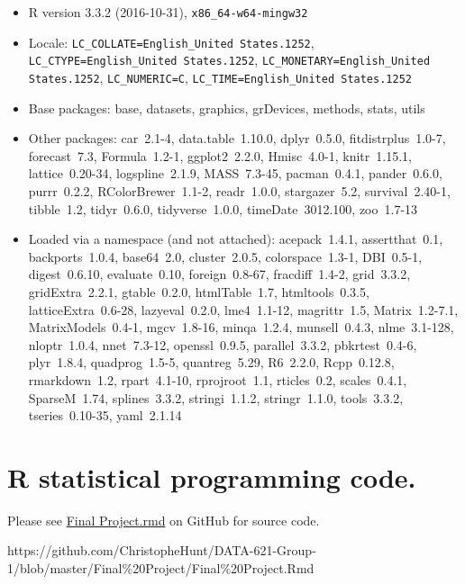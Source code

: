 \documentclass[]{elsarticle} %
\begin{document}
\begin{itemize}\raggedright
  \item R version 3.3.2 (2016-10-31), \verb|x86_64-w64-mingw32|
  \item Locale: \verb|LC_COLLATE=English_United States.1252|, \verb|LC_CTYPE=English_United States.1252|, \verb|LC_MONETARY=English_United States.1252|, \verb|LC_NUMERIC=C|, \verb|LC_TIME=English_United States.1252|
  \item Base packages: base, datasets, graphics, grDevices,
    methods, stats, utils
  \item Other packages: car~2.1-4, data.table~1.10.0, dplyr~0.5.0,
    fitdistrplus~1.0-7, forecast~7.3, Formula~1.2-1,
    ggplot2~2.2.0, Hmisc~4.0-1, knitr~1.15.1, lattice~0.20-34,
    logspline~2.1.9, MASS~7.3-45, pacman~0.4.1, pander~0.6.0,
    purrr~0.2.2, RColorBrewer~1.1-2, readr~1.0.0, stargazer~5.2,
    survival~2.40-1, tibble~1.2, tidyr~0.6.0, tidyverse~1.0.0,
    timeDate~3012.100, zoo~1.7-13
  \item Loaded via a namespace (and not attached): acepack~1.4.1,
    assertthat~0.1, backports~1.0.4, base64~2.0, cluster~2.0.5,
    colorspace~1.3-1, DBI~0.5-1, digest~0.6.10, evaluate~0.10,
    foreign~0.8-67, fracdiff~1.4-2, grid~3.3.2, gridExtra~2.2.1,
    gtable~0.2.0, htmlTable~1.7, htmltools~0.3.5,
    latticeExtra~0.6-28, lazyeval~0.2.0, lme4~1.1-12,
    magrittr~1.5, Matrix~1.2-7.1, MatrixModels~0.4-1, mgcv~1.8-16,
    minqa~1.2.4, munsell~0.4.3, nlme~3.1-128, nloptr~1.0.4,
    nnet~7.3-12, openssl~0.9.5, parallel~3.3.2, pbkrtest~0.4-6,
    plyr~1.8.4, quadprog~1.5-5, quantreg~5.29, R6~2.2.0,
    Rcpp~0.12.8, rmarkdown~1.2, rpart~4.1-10, rprojroot~1.1,
    rticles~0.2, scales~0.4.1, SparseM~1.74, splines~3.3.2,
    stringi~1.1.2, stringr~1.1.0, tools~3.3.2, tseries~0.10-35,
    yaml~2.1.14
\end{itemize}

\section{R statistical programming
code.}\label{r-statistical-programming-code.}

Please see
\href{https://github.com/ChristopheHunt/DATA-621-Group-1/blob/master/Final\%20Project/Final\%20Project.Rmd}{Final
Project.rmd} on GitHub for source code.

https://github.com/ChristopheHunt/DATA-621-Group-1/blob/master/Final\%20Project/Final\%20Project.Rmd

\newpage
\end{document}
